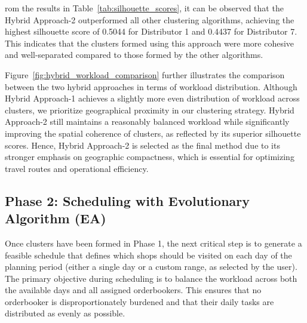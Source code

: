 rom the results in Table~\ref{tab:silhouette_scores}, it can be observed that the Hybrid Approach-2 outperformed all other clustering algorithms, achieving the highest silhouette score of 0.5044 for Distributor 1 and 0.4437 for Distributor 7. This indicates that the clusters formed using this approach were more cohesive and well-separated compared to those formed by the other algorithms.

Figure~\ref{fig:hybrid_workload_comparison} further illustrates the comparison between the two hybrid approaches in terms of workload distribution. Although Hybrid Approach-1 achieves a slightly more even distribution of workload across clusters, we prioritize geographical proximity in our clustering strategy. Hybrid Approach-2 still maintains a reasonably balanced workload while significantly improving the spatial coherence of clusters, as reflected by its superior silhouette scores. Hence, Hybrid Approach-2 is selected as the final method due to its stronger emphasis on geographic compactness, which is essential for optimizing travel routes and operational efficiency.


\subsection{Phase 2: Scheduling with Evolutionary Algorithm (EA)} %
Once clusters have been formed in Phase 1, the next critical step is to generate a feasible schedule that defines which shops should be visited on each day of the planning period (either a single day or a custom range, as selected by the user). The primary objective during scheduling is to balance the workload across both the available days and all assigned orderbookers. This ensures that no orderbooker is disproportionately burdened and that their daily tasks are distributed as evenly as possible.

